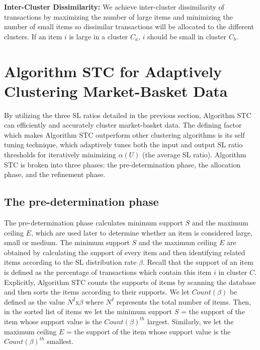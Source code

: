 \documentclass[11pt,reqno]{amsart}
\theoremstyle{definition}
\numberwithin{equation}{subsection}
\begin{document}
\textbf{Inter-Cluster Dissimilarity:} We achieve inter-cluster dissimilarity of transactions by maximizing the number of large items and minimizing the number of small items so dissimilar transactions will be allocated to the different clusters. If an item $i$ is large in a cluster $C_a$, $i$ should be small in cluster $C_b$. 

\section{Algorithm STC for Adaptively Clustering Market-Basket Data}
 By utilizing the three SL ratios detailed in the previous section, Algorithm STC can efficiently and accurately cluster market-basket data. The defining factor which  makes Algorithm STC outperform other clustering algorithms is its self tuning technique, which adaptively tunes both the input and output SL ratio thresholds for iteratively minimizing $\alpha(U)$ (the average SL ratio). Algorithm STC is broken into three phases: the pre-determination phase, the allocation phase, and the refinement phase.

\subsection{The pre-determination phase}The pre-determination phase calculates minimum support $S$ and the maximum ceiling $E$, which are used later to determine whether an item is considered large, small or medium. The minimum support $S$ and the maximum ceiling $E$ are obtained by calculating the support of every item and then identifying related items according to the SL distribution rate $\beta$.  Recall that the support of an item is defined as the percentage of transactions which contain this item $i$ in cluster $C$. Explicitly, Algorithm STC counts the supports of items by scanning the database and then sorts the items according to their supports. We let $Count(\beta)$ be defined as the value $N^I$x$\beta$ where  $N^I$ represents the total number of items. Then, in the sorted list of items we let the minimum support $S$ = the support of the item whose support value is the $Count(\beta)^{th}$ largest.  Similarly, we let the maximum ceiling $E$ = the support of the item whose support value is the $Count(\beta)^{th}$ smallest. 
\end{document}
